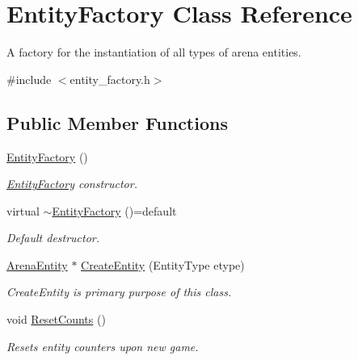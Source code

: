 \hypertarget{classEntityFactory}{}\section{Entity\+Factory Class Reference}
\label{classEntityFactory}


A factory for the instantiation of all types of arena entities.  




{\ttfamily \#include $<$entity\+\_\+factory.\+h$>$}

\subsection*{Public Member Functions}
\begin{DoxyCompactItemize}
\item 
\hyperlink{classEntityFactory_abaf0c4ceaa682e55f69b0ceae230008a}{Entity\+Factory} ()\hypertarget{classEntityFactory_abaf0c4ceaa682e55f69b0ceae230008a}{}\label{classEntityFactory_abaf0c4ceaa682e55f69b0ceae230008a}

\begin{DoxyCompactList}\small\item\em \hyperlink{classEntityFactory}{Entity\+Factory} constructor. \end{DoxyCompactList}\item 
virtual \hyperlink{classEntityFactory_ae3246f06fa101178803f76582323d4ad}{$\sim$\+Entity\+Factory} ()=default\hypertarget{classEntityFactory_ae3246f06fa101178803f76582323d4ad}{}\label{classEntityFactory_ae3246f06fa101178803f76582323d4ad}

\begin{DoxyCompactList}\small\item\em Default destructor. \end{DoxyCompactList}\item 
\hyperlink{classArenaEntity}{Arena\+Entity} $\ast$ \hyperlink{classEntityFactory_abf7b1ac4ec275728b47c37fcd85f81e8}{Create\+Entity} (Entity\+Type etype)
\begin{DoxyCompactList}\small\item\em Create\+Entity is primary purpose of this class. \end{DoxyCompactList}\item 
void \hyperlink{classEntityFactory_a775337bab24fda454b5214488d10cc30}{Reset\+Counts} ()\hypertarget{classEntityFactory_a775337bab24fda454b5214488d10cc30}{}\label{classEntityFactory_a775337bab24fda454b5214488d10cc30}

\begin{DoxyCompactList}\small\item\em Resets entity counters upon new game. \end{DoxyCompactList}\end{DoxyCompactItemize}


